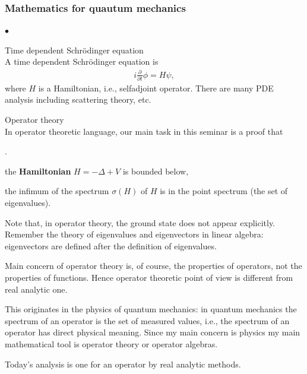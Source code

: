 \documentclass[openany, a4paper, oneside]{book}
\newcounter{enum2}
\renewenvironment{enumerate}{%
\begin{list}%
{%
\arabic{enum2}.\ \,%
}%
{%
\usecounter{enum2}
\setlength{\itemindent}{0pt}%
\setlength{\leftmargin}{6pt}%
\setlength{\rightmargin}{0pt}%
\setlength{\labelsep}{0pt}%
\setlength{\labelwidth}{6pt}%
\setlength{\itemsep}{0pt}%
\setlength{\parsep}{0pt}%
\setlength{\listparindent}{0pt}%
}
}{%
\end{list}%
}
\renewenvironment{itemize}{%
\begin{list}{$\bullet$\ \ }%
{%
\usecounter{enum2}
\setlength{\itemindent}{0pt}%
\setlength{\leftmargin}{6pt}%
\setlength{\rightmargin}{0pt}%
\setlength{\labelsep}{0pt}%
\setlength{\labelwidth}{6pt}%
\setlength{\itemsep}{0pt}%
\setlength{\parsep}{0pt}%
\setlength{\listparindent}{0pt}%
}
}{%
\end{list}%
}
\theoremstyle{break}
\theoremstyle{breakdefn}
\begin{document}
\subsubsection{Mathematics for quautum mechanics}
\label{sec-7-10-1-4-1}
\begin{itemize}

\item Time dependent Schr\"odinger equation\\
\label{sec-7-10-1-4-1-1}%
A time dependent Schr\"odinger equation is
\begin{align}
 i \frac{\partial}{\partial t} \phi = H \psi,
\end{align}
where $H$ is a Hamiltonian, i.e., selfadjoint operator.
There are many PDE analysis including scattering theory, etc.

\item Operator theory\\
\label{sec-7-10-1-4-1-2}%
In operator theoretic language, our main task in this seminar is a proof that
\begin{enumerate}
\item the \textbf{Hamiltonian} $H = - \Delta + V$ is bounded below,
\item the infimum of the spectrum $\sigma (H)$ of $H$ is in the point spectrum (the set of eigenvalues).
\end{enumerate}
Note that, in operator theory, the ground state does not appear explicitly.
Remember the theory of eigenvalues and eigenvectors in linear algebra:
eigenvectors are defined after the definition of eigenvalues.

Main concern of operator theory is, of course, the properties of operators, not the properties of functions.
Hence operator theoretic point of view is different from real analytic one.

This originates in the physics of quantum mechanics:
in quantum mechanics the spectrum of an operator is the set of measured values, i.e.,
the spectrum of an operator has direct physical meaning.
Since my main concern is physics my main mathematical tool is operator theory or operator algebras.

Today's analysis is one for an operator by real analytic methods.


\end{itemize}
\end{document}
